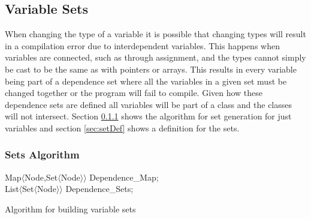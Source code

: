 \documentclass[natbib]{article}
\begin{document}
\subsection{Variable Sets}
When changing the type of a variable it is possible that changing types will result in a 
compilation error due to interdependent variables. This happens when variables are connected, 
such as through assignment, and the types cannot simply be cast to be the same as with pointers 
or arrays. This results in every variable being part of a dependence set where all the variables 
in a given set must be changed together or the program will fail to compile. Given how these 
dependence sets are defined all variables will be part of a class and the classes will not intersect. 
Section \ref{sec:setAlg} shows the algorithm for set generation for just variables and 
section \ref{sec:setDef} shows a definition for the sets.

\subsubsection{Sets Algorithm} \label{sec:setAlg}
\begin{algorithm}[H]
\label{variableSetAlgo}
\SetAlgoLined
{}
Map$\langle$Node,Set$\langle$Node$\rangle\rangle$ Dependence\_Map;\\
List$\langle$Set$\langle$Node$\rangle\rangle$ Dependence\_Sets;\\
 \caption{Algorithm for building variable sets}
\end{algorithm}
\end{document}
